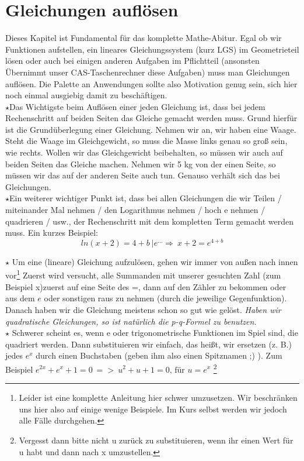 \section{Gleichungen auflösen}
	Dieses Kapitel ist Fundamental für das komplette Mathe-Abitur. Egal ob wir
	Funktionen aufstellen, ein lineares Gleichungssystem (kurz LGS) im
	Geometrieteil lösen oder auch bei einigen anderen Aufgaben im Pflichtteil
	(ansonsten Übernimmt unser CAS-Taschenrechner diese Aufgaben) muss man
	Gleichungen auflösen. Die Palette an Anwendungen sollte also Motivation genug
	sein, sich hier noch einmal ausgiebig damit zu beschäftigen.\\
	
	\(\star\)Das Wichtigste beim Auflösen einer jeden Gleichung ist, dass bei jedem
	Rechenschritt auf beiden Seiten das Gleiche gemacht werden muss. Grund hierfür
	ist die Grundüberlegung einer Gleichung. Nehmen wir an, wir haben eine Waage.
	Steht die Waage im Gleichgewicht, so muss die Masse links genau so groß sein,
	wie rechts. Wollen wir das Gleichgewicht beibehalten, so müssen wir auch auf
	beiden Seiten das Gleiche machen. Nehmen wir 5 kg von der einen Seite, so
	müssen wir das auf der anderen Seite auch tun. Genauso verhält sich das bei
	Gleichungen. \\
	
	\(\star\)Ein weiterer wichtiger Punkt ist, dass bei allen Gleichungen die wir
	Teilen / miteinander Mal nehmen / den Logarithmus nehmen / hoch e nehmen /
	quadrieren / usw., der Rechenschritt mit dem kompletten Term gemacht werden
	muss. Ein kurzes Beispiel:
	\[ln(x+2)=4+b\ |e^{...}\Rightarrow\ x+2=e^{4+b}\]
	
	\(\star\) Um eine (lineare) Gleichung aufzulösen, gehen wir immer von außen
	nach innen vor\footnote{Leider ist eine komplette Anleitung hier schwer
	umzusetzen. Wir beschränken uns hier also auf einige wenige Beispiele. Im Kurs
	selbst werden wir jedoch alle Fälle durchgehen.} Zuerst wird versucht, alle
	Summanden mit unserer gesuchten Zahl (zum Beispiel x)zuerst auf eine Seite des
	=, dann auf den Zähler zu bekommen oder aus dem \(e\) oder sonstigen raus zu
	nehmen (durch die jeweilige Gegenfunktion). Danach haben wir die Gleichung
	meistens schon so gut wie gelöst. \emph{Haben wir quadratische Gleichungen, so
	ist natürlich die p-q-Formel zu benutzen.}\\
	
	\(\star\) Schwerer scheint es, wenn e oder trigonometrische Funktionen im Spiel
	sind, die quadriert werden. Dann substituieren wir einfach, das heißt, wir
	ersetzen (z. B.) jedes \(e^x\) durch einen Buchstaben (geben ihm also einen
	Spitznamen ;) ). Zum Beispiel \(e^{2x}+e^x+1=0\ =>\ u^2+u+1=0\text{, für
	}u=e^x\) \footnote{Vergesst dann bitte nicht u zurück zu substituieren, wenn
	ihr einen Wert für u habt und dann nach x umzustellen.}
